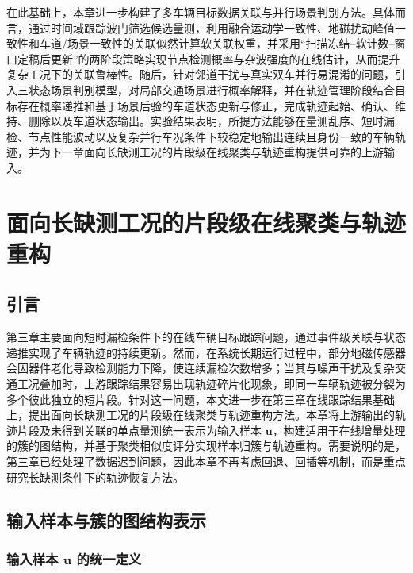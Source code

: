 \documentclass{xdupgthesis}
\begin{document}
在此基础上，本章进一步构建了多车辆目标数据关联与并行场景判别方法。具体而言，通过时间域跟踪波门筛选候选量测，利用融合运动学一致性、地磁扰动峰值一致性和车道/场景一致性的关联似然计算软关联权重，并采用“扫描冻结--软计数--窗口定稿后更新”的两阶段策略实现节点检测概率与杂波强度的在线估计，从而提升复杂工况下的关联鲁棒性。随后，针对邻道干扰与真实双车并行易混淆的问题，引入三状态场景判别模型，对局部交通场景进行概率解释，并在轨迹管理阶段结合目标存在概率递推和基于场景后验的车道状态更新与修正，完成轨迹起始、确认、维持、删除以及车道状态输出。实验结果表明，所提方法能够在量测乱序、短时漏检、节点性能波动以及复杂并行车况条件下较稳定地输出连续且身份一致的车辆轨迹，并为下一章面向长缺测工况的片段级在线聚类与轨迹重构提供可靠的上游输入。





\chapter{面向长缺测工况的片段级在线聚类与轨迹重构}
\label{chap:fragment_cluster_reconstruction}

\section{引言}

第三章主要面向短时漏检条件下的在线车辆目标跟踪问题，通过事件级关联与状态递推实现了车辆轨迹的持续更新。然而，在系统长期运行过程中，部分地磁传感器会因器件老化导致检测能力下降，使连续漏检次数增多；当其与噪声干扰及复杂交通工况叠加时，上游跟踪结果容易出现轨迹碎片化现象，即同一车辆轨迹被分裂为多个彼此独立的短片段。针对这一问题，本文进一步在第三章在线跟踪结果基础上，提出面向长缺测工况的片段级在线聚类与轨迹重构方法。本章将上游输出的轨迹片段及未得到关联的单点量测统一表示为输入样本 $\mathbf{u}$，构建适用于在线增量处理的簇的图结构，并基于聚类相似度评分实现样本归簇与轨迹重构。需要说明的是，第三章已经处理了数据迟到问题，因此本章不再考虑回退、回插等机制，而是重点研究长缺测条件下的轨迹恢复方法。

\section{输入样本与簇的图结构表示}

\subsection{输入样本 $\mathbf{u}$ 的统一定义}
\end{document}

